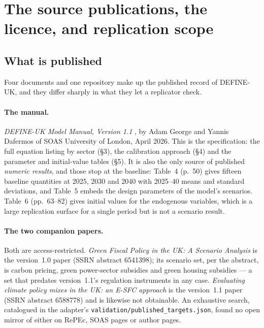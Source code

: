 \section{The source publications, the licence, and replication scope}
\label{sec:source}

\subsection{What is published}

Four documents and one repository make up the published record of DEFINE-UK, and they differ sharply in what they let a replicator check.

\paragraph{The manual.} \emph{DEFINE-UK Model Manual, Version 1.1} \citep{georgedafermos2026manual}, by Adam George and Yannis Dafermos of SOAS University of London, April 2026. This is the specification: the full equation listing by sector (\S3), the calibration approach (\S4) and the parameter and initial-value tables (\S5). It is also the only source of published \emph{numeric results}, and those stop at the baseline: Table~4 (p.~50) gives fifteen baseline quantities at 2025, 2030 and 2040 with 2025--40 means and standard deviations, and Table~5 embeds the design parameters of the model's scenarios. Table~6 (pp.~63--82) gives initial values for the endogenous variables, which is a large replication surface for a single period but is not a scenario result.

\paragraph{The two companion papers.} Both are access-restricted. \emph{Green Fiscal Policy in the UK: A Scenario Analysis} \citep{georgedafermos2026scenario} is the version~1.0 paper (SSRN abstract 6541398); its scenario set, per the abstract, is carbon pricing, green power-sector subsidies and green housing subsidies --- a set that predates version~1.1's regulation instruments in any case. \emph{Evaluating climate policy mixes in the UK: an E-SFC approach} \citep{georgedafermos2026mixes} is the version~1.1 paper (SSRN abstract 6588778) and is likewise not obtainable. An exhaustive search, catalogued in the adapter's \texttt{validation/published\_targets.json}, found no open mirror of either on RePEc, SOAS pages or author pages.

